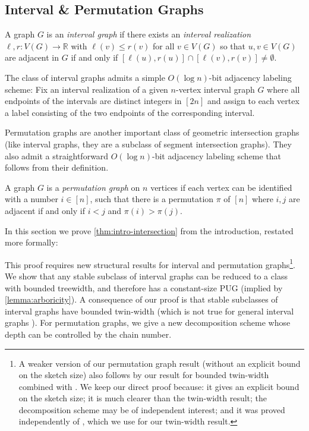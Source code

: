 \documentclass{article}
\makeatletter
\newcommand{\cF}{\ensuremath{\mathcal{F}}}
\newcommand{\bR}{\ensuremath{\mathbb{R}}}
\newcommand\IfRestateTF{%
  \ifx\label\thmt@gobble@label %
    \expandafter\@firstoftwo
  \else
    \expandafter\@secondoftwo
  \fi
}
\newcommand{\RestateRemark}{\IfRestateTF{{\normalfont\bfseries (Restated) }}{}}
\makeatother
\begin{document}
\subsection{Interval \& Permutation Graphs}
\label{section:intersection graphs}

\begin{definition}
A graph $G$ is an \emph{interval graph} if there
exists an \emph{interval realization} $\ell, r : V(G) \to \bR$ with $\ell(v) \le r(v)$ for all $v\in
V(G)$ so that $u,v\in V(G)$ are adjacent in $G$ if and only if $[\ell(u),r(u)]\cap[\ell(v),r(v)] \ne
\emptyset$.
\end{definition}

The class of interval graphs admits a simple $O(\log n)$-bit adjacency labeling scheme: Fix an
interval realization of a given $n$-vertex interval graph $G$ where all endpoints of the intervals
are distinct integers in $[2n]$ and assign to each vertex a label consisting of the two endpoints of
the corresponding interval.

Permutation graphs are another important class of geometric intersection graphs (like interval
graphs, they are a subclass of segment intersection graphs). They also admit a straightforward
$O(\log n)$-bit adjacency labeling scheme that follows from their definition.

\begin{definition}
	A graph $G$ is a \emph{permutation graph} on $n$ vertices if each vertex can be identified with a
	number $i \in [n]$, such that there is a permutation $\pi$ of $[n]$ where $i,j$ are adjacent if and
	only if $i < j$ and $\pi(i) > \pi(j)$.
\end{definition}

In this section we prove \cref{thm:intro-intersection} from the introduction, restated more formally:

This proof requires new structural results for interval and permutation graphs\footnote{A weaker
version of our permutation graph result (without an explicit bound on the sketch size)
also follows by our result for bounded twin-width combined with \cite{BKTW20}. We keep our
direct proof because: it gives an explicit bound on the sketch size; it is much clearer than the
twin-width result; the decomposition scheme may be of independent interest; and it was proved
independently of \cite{GPT21}, which we use for our twin-width result.}. We show that any stable
subclass of interval graphs can be reduced to a class with bounded treewidth, and therefore has a
constant-size PUG (implied by \cref{lemma:arboricity}).  A consequence of our proof is that stable
subclasses of interval graphs have bounded twin-width (which is not true for general interval
graphs \cite{BKTW20}).  For permutation graphs, we give a new decomposition scheme whose depth can
be controlled by the chain number.
\end{document}
